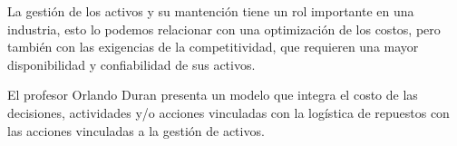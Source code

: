 \documentclass[]{article}
\begin{document}
La gestión de los activos y su mantención tiene un rol importante en una industria, esto lo podemos relacionar con una optimización de los costos, pero también con las exigencias de la competitividad, que requieren una mayor disponibilidad y confiabilidad de sus activos.


El profesor Orlando Duran presenta un modelo que integra el costo de las decisiones, actividades y/o acciones vinculadas con la logística de repuestos con las acciones vinculadas a la gestión de activos.



\begin{center}
    




\begin{tikzpicture}[x=0.75pt,y=0.75pt,yscale=-1,xscale=1]


\end{tikzpicture}
\end{center}
\end{document}
